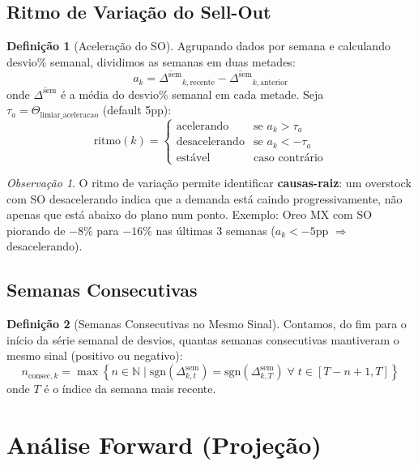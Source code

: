 \documentclass[a4paper, 12pt]{report}
\theoremstyle{definition}
\newtheorem{definicao}{Defini\c{c}\~ao}[chapter]
\theoremstyle{remark}
\newtheorem{observacao}{Observa\c{c}\~ao}[chapter]
\newcommand{\N}{\mathbb{N}}
\newcommand{\set}[1]{\left\{#1\right\}}
\begin{document}
\subsection{Ritmo de Varia\c{c}\~ao do Sell-Out}

\begin{definicao}[Acelera\c{c}\~ao do SO]
  Agrupando dados por semana e calculando desvio\% semanal, dividimos
  as semanas em duas metades:
  \[
    a_k = \overline{\Delta^{\text{sem}}}_{k,\text{recente}}
         - \overline{\Delta^{\text{sem}}}_{k,\text{anterior}}
  \]
  onde $\overline{\Delta^{\text{sem}}}$ \'e a m\'edia do desvio\% semanal
  em cada metade. Seja $\tau_a = \Theta_{\text{limiar\_aceleracao}}$
  (default 5pp):
  \[
    \text{ritmo}(k) = \begin{cases}
      \text{acelerando} & \text{se } a_k > \tau_a \\
      \text{desacelerando} & \text{se } a_k < -\tau_a \\
      \text{est\'avel} & \text{caso contr\'ario}
    \end{cases}
  \]
\end{definicao}

\begin{observacao}
  O ritmo de varia\c{c}\~ao permite identificar \textbf{causas-raiz}:
  um overstock com SO desacelerando indica que a demanda est\'a caindo
  progressivamente, n\~ao apenas que est\'a abaixo do plano num ponto.
  Exemplo: Oreo MX com SO piorando de $-8\%$ para $-16\%$ nas \'ultimas
  3 semanas ($a_k < -5$pp $\Rightarrow$ desacelerando).
\end{observacao}


\subsection{Semanas Consecutivas}

\begin{definicao}[Semanas Consecutivas no Mesmo Sinal]
  Contamos, do fim para o in\'icio da s\'erie semanal de desvios, quantas
  semanas consecutivas mantiveram o mesmo sinal (positivo ou negativo):
  \[
    n_{\text{consec},k} = \max\set{n \in \N \mid
      \text{sgn}(\Delta^{\text{sem}}_{k,t}) = \text{sgn}(\Delta^{\text{sem}}_{k,T})
      \;\forall\; t \in [T-n+1, T]}
  \]
  onde $T$ \'e o \'indice da semana mais recente.
\end{definicao}


\section{An\'alise Forward (Proje\c{c}\~ao)}
\end{document}
